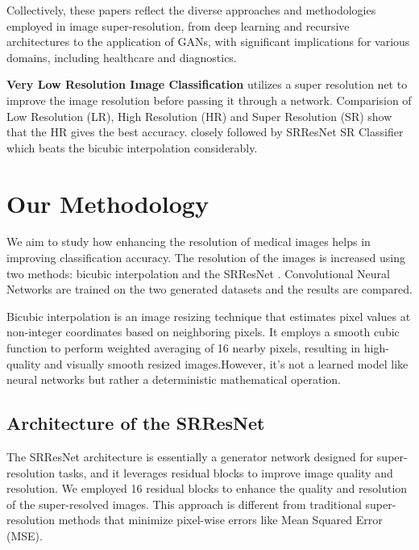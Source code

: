 \documentclass[10pt,twocolumn,letterpaper]{article}
\begin{document}
Collectively, these papers reflect the diverse approaches and methodologies employed in image super-resolution, from deep learning and recursive architectures to the application of GANs, with significant implications for various domains, including healthcare and diagnostics.

\textbf{Very Low Resolution Image Classification}\cite{vest2017very} utilizes a super resolution net to improve the image resolution before passing it through a network. Comparision of Low Resolution (LR), High Resolution (HR) and Super Resolution (SR) show that the HR gives the best accuracy. closely followed by SRResNet \cite{ledig2017photo} SR Classifier which beats the bicubic interpolation considerably.


\section{Our Methodology}
We aim to study how enhancing the resolution of medical images helps in improving classification accuracy. 
The resolution of the images is increased using two methods: bicubic interpolation and the SRResNet \cite{ledig2017photo}. Convolutional Neural Networks are trained on the two generated datasets and the results are compared. 

Bicubic interpolation is an image resizing technique that estimates pixel values at non-integer coordinates based on neighboring pixels. It employs a smooth cubic function to perform weighted averaging of 16 nearby pixels, resulting in high-quality and visually smooth resized images.However, it's not a learned model like neural networks but rather a deterministic mathematical operation.

\subsection{Architecture of the SRResNet}
The SRResNet \cite{ledig2017photo} architecture is essentially a generator network designed for super-resolution tasks, and it leverages residual blocks to improve image quality and resolution. We employed 16 residual blocks to enhance the quality and resolution of the super-resolved images. This approach is different from traditional super-resolution methods that minimize pixel-wise errors like Mean Squared Error (MSE).
\end{document}
